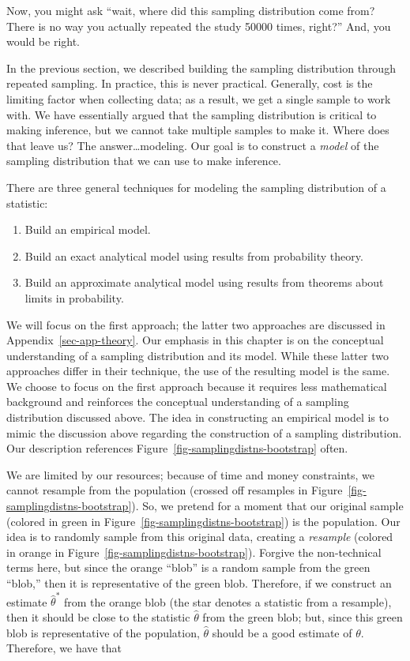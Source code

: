 \documentclass[
  letterpaper,
  DIV=11,
  numbers=noendperiod]{scrreprt}
\providecommand{\tightlist}{%
  \setlength{\itemsep}{0pt}\setlength{\parskip}{0pt}}\usepackage{longtable,booktabs,array}
\theoremstyle{plain}
\theoremstyle{definition}
\theoremstyle{definition}
\theoremstyle{remark}
\begin{document}
Now, you might ask ``wait, where did this sampling distribution come
from? There is no way you actually repeated the study 50000 times,
right?'' And, you would be right.

In the previous section, we described building the sampling distribution
through repeated sampling. In practice, this is never practical.
Generally, cost is the limiting factor when collecting data; as a
result, we get a single sample to work with. We have essentially argued
that the sampling distribution is critical to making inference, but we
cannot take multiple samples to make it. Where does that leave us? The
answer\ldots modeling. Our goal is to construct a \emph{model} of the
sampling distribution that we can use to make inference.

There are three general techniques for modeling the sampling
distribution of a statistic:

\begin{enumerate}
\def\labelenumi{\arabic{enumi}.}
\tightlist
\item
  Build an empirical model.
\item
  Build an exact analytical model using results from probability theory.
\item
  Build an approximate analytical model using results from theorems
  about limits in probability.
\end{enumerate}

We will focus on the first approach; the latter two approaches are
discussed in Appendix~\ref{sec-app-theory}. Our emphasis in this chapter
is on the conceptual understanding of a sampling distribution and its
model. While these latter two approaches differ in their technique, the
use of the resulting model is the same. We choose to focus on the first
approach because it requires less mathematical background and reinforces
the conceptual understanding of a sampling distribution discussed above.
The idea in constructing an empirical model is to mimic the discussion
above regarding the construction of a sampling distribution. Our
description references Figure~\ref{fig-samplingdistns-bootstrap} often.

We are limited by our resources; because of time and money constraints,
we cannot resample from the population (crossed off resamples in
Figure~\ref{fig-samplingdistns-bootstrap}). So, we pretend for a moment
that our original sample (colored in green in
Figure~\ref{fig-samplingdistns-bootstrap}) is the population. Our idea
is to randomly sample from this original data, creating a
\emph{resample} (colored in orange in
Figure~\ref{fig-samplingdistns-bootstrap}). Forgive the non-technical
terms here, but since the orange ``blob'' is a random sample from the
green ``blob,'' then it is representative of the green blob. Therefore,
if we construct an estimate \(\widehat{\theta}^*\) from the orange blob
(the star denotes a statistic from a resample), then it should be close
to the statistic \(\widehat{\theta}\) from the green blob; but, since
this green blob is representative of the population,
\(\widehat{\theta}\) should be a good estimate of \(\theta\). Therefore,
we have that
\end{document}
